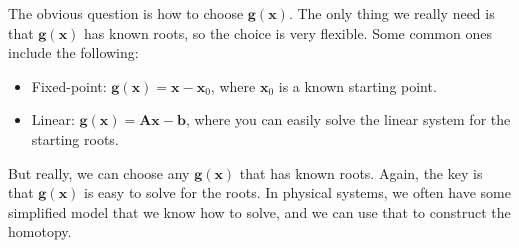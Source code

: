 The obvious question is how to choose $\mathbf{g}(\mathbf{x})$. The only thing we really need is that $\mathbf{g}(\mathbf{x})$ has known roots, so the choice is very flexible. Some common ones include the following:
\begin{itemize}
    \item Fixed-point: $\mathbf{g}(\mathbf{x}) = \mathbf{x} - \mathbf{x}_0$, where $\mathbf{x}_0$ is a known starting point.
    \item Linear: $\mathbf{g}(\mathbf{x}) = \mathbf{A}\mathbf{x} - \mathbf{b}$, where you can easily solve the linear system for the starting roots.
\end{itemize}
But really, we can choose any $\mathbf{g}(\mathbf{x})$ that has known roots. Again, the key is that $\mathbf{g}(\mathbf{x})$ is easy to solve for the roots. In physical systems, we often have some simplified model that we know how to solve, and we can use that to construct the homotopy.
